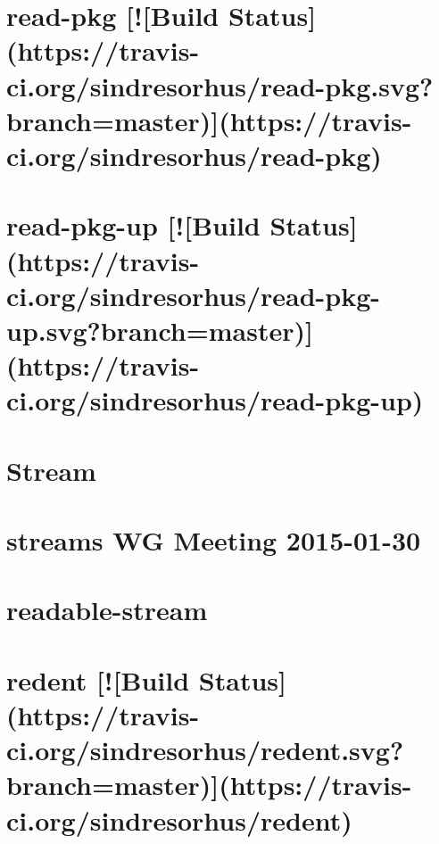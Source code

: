 \documentclass[twoside]{book}
\newcommand{\+}{\discretionary{\mbox{\scriptsize$\hookleftarrow$}}{}{}}
\begin{document}
\chapter{read-\/pkg \mbox{[}!\mbox{[}Build Status\mbox{]}(https\+://travis-\/ci.org/sindresorhus/read-\/pkg.svg?branch=master)\mbox{]}(https\+://travis-\/ci.org/sindresorhus/read-\/pkg)}
\label{md_app_web_node_modules_read-pkg_readme}

\chapter{read-\/pkg-\/up \mbox{[}!\mbox{[}Build Status\mbox{]}(https\+://travis-\/ci.org/sindresorhus/read-\/pkg-\/up.svg?branch=master)\mbox{]}(https\+://travis-\/ci.org/sindresorhus/read-\/pkg-\/up)}
\label{md_app_web_node_modules_read-pkg-up_readme}

\chapter{Stream}
\label{md_app_web_node_modules_readable-stream_doc_stream}

\chapter{streams WG Meeting 2015-\/01-\/30}
\label{md_app_web_node_modules_readable-stream_doc_wg-meetings_2015-01-30}

\chapter{readable-\/stream}
\label{md_app_web_node_modules_readable-stream__r_e_a_d_m_e}

\chapter{redent \mbox{[}!\mbox{[}Build Status\mbox{]}(https\+://travis-\/ci.org/sindresorhus/redent.svg?branch=master)\mbox{]}(https\+://travis-\/ci.org/sindresorhus/redent)}
\label{md_app_web_node_modules_redent_readme}

\end{document}
